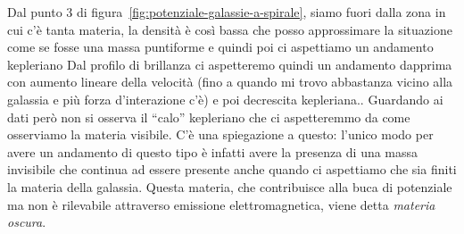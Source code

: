 Dal punto 3 di figura~\ref{fig:potenziale-galassie-a-spirale}, siamo fuori dalla zona in cui c’è tanta materia, la densità è così bassa che posso approssimare la situazione come se fosse una massa puntiforme e quindi poi ci aspettiamo un andamento kepleriano Dal profilo di brillanza ci aspetteremo quindi un andamento dapprima con aumento lineare della velocità (fino a quando mi trovo abbastanza vicino alla galassia e più forza d'interazione c'è) e poi decrescita kepleriana.. Guardando ai dati però non si osserva il “calo” kepleriano che ci aspetteremmo da come osserviamo la materia visibile. C'è una spiegazione a questo: l'unico modo per avere un andamento di questo tipo è infatti avere la presenza di una massa invisibile che continua ad essere presente anche quando ci aspettiamo che sia finiti la materia della galassia. Questa materia, che contribuisce alla buca di potenziale ma non è rilevabile attraverso emissione elettromagnetica, viene detta \emph{materia oscura}.
